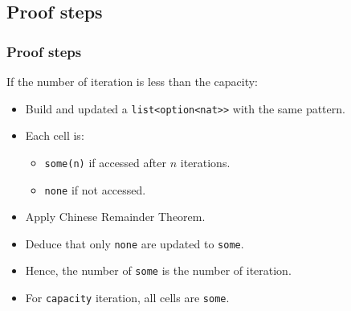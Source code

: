 \documentclass{beamer}
\begin{document}
\subsection{Proof steps}
\begin{frame}
	\frametitle{Proof steps}
	If the number of iteration is less than the capacity: 
	\begin{itemize}
		\item Build and updated a \texttt{list<option<nat>>} with the same pattern.
		\item Each cell is: 
			\begin{itemize}
				\item \texttt{some(n)} if accessed after $n$ iterations.
				\item \texttt{none} if not accessed.
			\end{itemize}
		\item Apply Chinese Remainder Theorem.
		\item Deduce that only \texttt{none} are updated to \texttt{some}.
		\item Hence, the number of \texttt{some} is the number of iteration.
		\item For \texttt{capacity} iteration, all cells are \texttt{some}.
	\end{itemize}
\end{frame}
\end{document}
